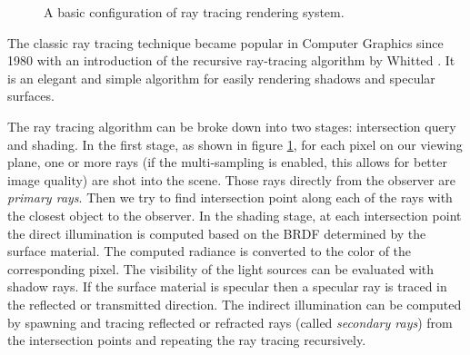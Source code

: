 \begin{figure}[ht]
    \centering
    \renewcommand{\thefigure}{\thechapter.\arabic{figure}}
    \caption[Ray Tracing System Configuration]{A basic configuration of ray tracing rendering system.}
    \label{fig:ray_tracing}
\end{figure}

The classic ray tracing technique became popular in Computer Graphics since 1980 with an introduction of the recursive ray-tracing algorithm by Whitted \cite{Whitted1980}. It is an elegant and simple algorithm for easily rendering shadows and specular surfaces.

The ray tracing algorithm can be broke down into two stages: intersection query and shading. In the first stage, as shown in figure \ref{fig:ray_tracing}, for each pixel on our viewing plane, one or more rays (if the multi-sampling is enabled, this allows for better image quality) are shot into the scene. Those rays directly from the observer are \emph{primary rays}. Then we try to find intersection point along each of the rays with the closest object to the observer. In the shading stage, at each intersection point the direct illumination is computed based on the BRDF determined by the surface material. The computed radiance is converted to the color of the corresponding pixel. The visibility of the light sources can be evaluated with shadow rays.
If the surface material is specular then a specular ray is traced in the reflected or transmitted direction. The indirect illumination can be computed by spawning and tracing reflected or refracted rays (called \emph{secondary rays}) from the intersection points and repeating the ray tracing recursively.

